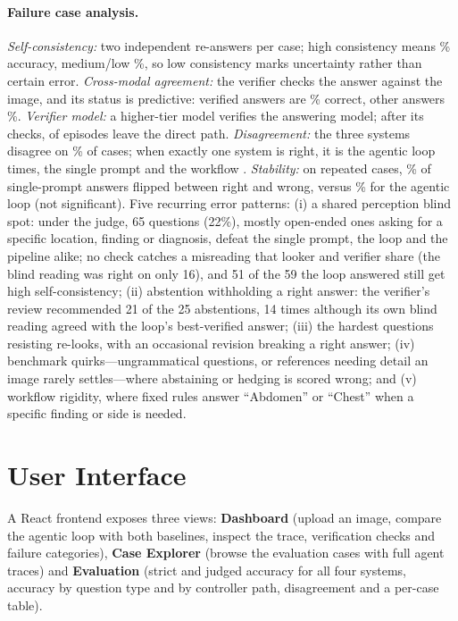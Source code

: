 \documentclass{article}
\begin{document}
\paragraph{Failure case analysis.}
\emph{Self-consistency:} two independent re-answers per case; high consistency means \ScHighAcc\% accuracy,
medium/low \ScMedLowRange\%, so low consistency marks uncertainty rather than certain error.
\emph{Cross-modal agreement:} the verifier checks the answer against the image, and its status is predictive:
verified answers are \SigVerAcc\% correct, other answers \UnverAcc\%.
\emph{Verifier model:} a higher-tier model verifies the answering model; after its checks, \NotDirect{} of \NCases{}
episodes leave the direct path.
\emph{Disagreement:} the three systems disagree on \DisagreePct\% of cases; when exactly one system is right, it is the
agentic loop \WinsAg{} times, the single prompt \WinsBase{} and the workflow \WinsWf.
\emph{Stability:} on \VarCases{} repeated cases, \VarBaseFlip\% of single-prompt answers flipped between right and
wrong, versus \VarAgFlip\% for the agentic loop (not significant).
Five recurring error patterns: (i) a shared perception blind spot: under the judge, 65 questions (22\%), mostly open-ended
ones asking for a specific location, finding or diagnosis, defeat the single prompt, the loop and the pipeline alike;
no check catches a misreading that looker and verifier share (the blind reading was right on only 16), and 51 of the 59 the loop answered still get high
self-consistency; (ii) abstention withholding a right answer: the verifier's review recommended 21 of the
25 abstentions, 14 times although its own blind reading agreed with the loop's best-verified answer; (iii) the hardest questions resisting re-looks, with an occasional revision breaking a
right answer; (iv) benchmark quirks---ungrammatical questions, or references needing detail an image rarely
settles---where abstaining or hedging is scored wrong; and (v) workflow rigidity, where fixed rules answer
``Abdomen'' or ``Chest'' when a specific finding or side is needed.

\section{User Interface}\label{sec:ui}
A React frontend exposes three views: \textbf{Dashboard} (upload an image, compare the agentic loop with both
baselines, inspect the trace, verification checks and failure categories), \textbf{Case Explorer} (browse the \NCases{}
evaluation cases with full agent traces) and \textbf{Evaluation} (strict and judged accuracy for all four systems,
accuracy by question type and by controller path, disagreement and a per-case table).
\end{document}
